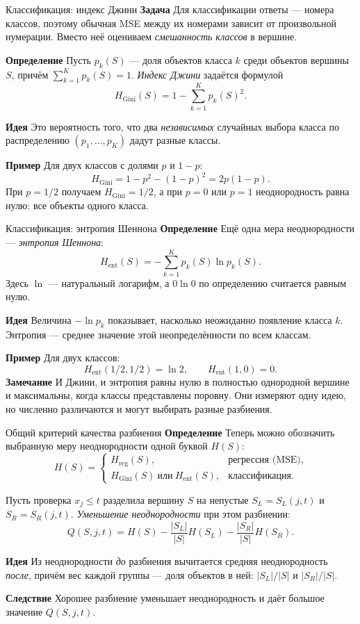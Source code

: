 \documentclass[10pt]{beamer}
\newcommand{\mlBody}{\normalsize}
\newcommand{\mlDefinition}{\textcolor{defblue}{\bfseries Определение}}
\newcommand{\mlRemark}{\textcolor{defblue}{\bfseries Замечание}}
\newcommand{\mlConsequence}{\textcolor{defblue}{\bfseries Следствие}}
\newcommand{\mlIdea}{\textcolor{defblue}{\bfseries Идея}}
\newcommand{\mlTask}{\textcolor{defblue}{\bfseries Задача}}
\newcommand{\mlExample}{\textcolor{defblue}{\bfseries Пример}}
\begin{document}
\begin{frame}{Классификация: индекс Джини}
\mlBody
\mlTask\; Для классификации ответы --- номера классов, поэтому
обычная MSE между их номерами зависит от произвольной нумерации.
Вместо неё оцениваем \emph{смешанность классов} в вершине.

\mlDefinition\; Пусть $p_k(S)$ --- доля объектов класса $k$ среди
объектов вершины $S$, причём $\sum_{k=1}^{K}p_k(S)=1$.
\textit{Индекс Джини} задаётся формулой
\[
  \boxed{H_{\mathrm{Gini}}(S)=1-\sum_{k=1}^{K}p_k(S)^2.}
\]

\mlIdea\; Это вероятность того, что два \emph{независимых}
случайных выбора класса по распределению $(p_1,\ldots,p_K)$
дадут разные классы.

\mlExample\; Для двух классов с долями $p$ и $1-p$:
\[
 H_{\mathrm{Gini}}=1-p^2-(1-p)^2=2p(1-p).
\]
При $p=1/2$ получаем $H_{\mathrm{Gini}}=1/2$, а при $p=0$ или
$p=1$ неоднородность равна нулю: все объекты одного класса.
\end{frame}

\begin{frame}{Классификация: энтропия Шеннона}
\mlBody
\mlDefinition\; Ещё одна мера неоднородности ---
\textit{энтропия Шеннона}:
\[
  \boxed{H_{\mathrm{ent}}(S)=-\sum_{k=1}^{K}p_k(S)\ln p_k(S).}
\]
Здесь $\ln$ --- натуральный логарифм, а $0\ln 0$ по определению
считается равным нулю.

\mlIdea\; Величина $-\ln p_k$ показывает, насколько неожиданно
появление класса $k$. Энтропия --- среднее значение этой
неопределённости по всем классам.

\mlExample\; Для двух классов:
\[
  H_{\mathrm{ent}}(1/2,1/2)=\ln 2,
  \qquad H_{\mathrm{ent}}(1,0)=0.
\]
\mlRemark\; И Джини, и энтропия равны нулю в полностью однородной
вершине и максимальны, когда классы представлены поровну.
Они измеряют одну идею, но численно различаются и могут выбирать
разные разбиения.
\end{frame}

\begin{frame}{Общий критерий качества разбиения}
\mlBody
\mlDefinition\; Теперь можно обозначить выбранную меру
неоднородности одной буквой $H(S)$:
\[
 H(S)=\begin{cases}
 H_{\mathrm{reg}}(S), & \text{регрессия (MSE)},\\
 H_{\mathrm{Gini}}(S)\ \text{или}\ H_{\mathrm{ent}}(S), & \text{классификация}.
 \end{cases}
\]

Пусть проверка $x_j\le t$ разделила вершину $S$ на
непустые $S_L=S_L(j,t)$ и $S_R=S_R(j,t)$.
\textit{Уменьшение неоднородности} при этом разбиении:
\[
 \boxed{Q(S,j,t)=H(S)
 -\frac{|S_L|}{|S|}H(S_L)
 -\frac{|S_R|}{|S|}H(S_R).}
\]

\mlIdea\; Из неоднородности \emph{до} разбиения вычитается
средняя неоднородность \emph{после}, причём вес каждой группы ---
доля объектов в ней: $|S_L|/|S|$ и $|S_R|/|S|$.

\mlConsequence\; Хорошее разбиение уменьшает неоднородность
и даёт большое значение $Q(S,j,t)$.
\end{frame}
\end{document}
